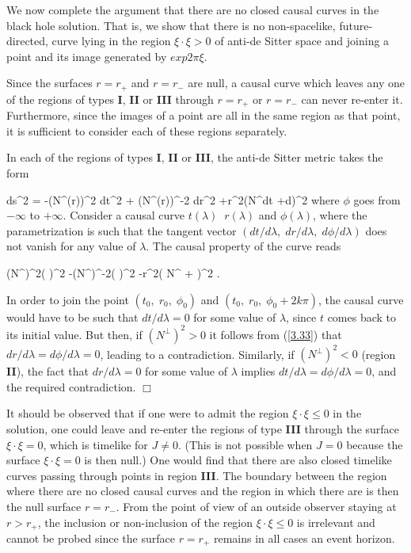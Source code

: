 We now complete the argument that there are no closed causal
curves in the black hole solution. That is, we show that there
is no non-spacelike, future-directed, curve lying in the region
$\xi \cdot \xi >0$ of anti-de Sitter space and joining a point
and its image generated by $exp 2\pi \xi$.

Since the surfaces $r=r_{+}$ and $r=r_{-}$ are null, a causal
curve which leaves any one of the regions of types {\bf I},
{\bf II} or {\bf III} through $r=r_{+}$ or $r=r_{-}$ can never
re-enter it. Furthermore, since the images of a point are all in
the same region as that point, it is sufficient to consider each
of these regions separately.

In each of the regions of types {\bf I}, {\bf II} or {\bf III},
the anti-de Sitter metric takes the form

\bb
ds^2 = -(N^{\perp}(r))^2 dt^2 + (N^{\perp}(r))^{-2} dr^2
+r^2(N^{\phi}dt +d\phi)^2
\ee
%
where $\phi$ goes from $-\infty$ to $+\infty$. Consider a
causal curve $t(\lambda)\;\; r(\lambda)$ and $\phi(\lambda)$,
where the parametrization is such that the tangent vector
$(dt/d\lambda,\; dr/d\lambda,\; d\phi/d\lambda)$ does not vanish
for any value of $\lambda$. The causal property of the curve
reads

\bb
(N^{\perp})^2\left( \right)^2 -(N^{\perp})^{-2}\left(
 \right)^2
-r^2\left( N^{\phi} + \right)^2
.
\label{3.33}
\ee

In order to join the point $(t_0,\; r_0,\; \phi_0)$ and $(t_0,\;
r_0,\; \phi_0 +2k\pi)$, the causal curve would have to be such
that $dt/d\lambda =0$ for some value of $\lambda$, since
$t$ comes back to its initial value. But then, if $(N^{\perp})^2 > 0$ it
follows from (\ref{3.33}) that $dr/d\lambda = d\phi/d\lambda
=0$, leading to a contradiction.  Similarly, if $(N^{\perp})^2 <0$ (region
{\bf II}), the fact that $dr/d\lambda =0$ for some value
of $\lambda$ implies $dt/d\lambda= d\phi/d\lambda =0$, and the
required contradiction.  $\Box$

It should be observed that if one were to admit the region $\xi
\cdot \xi \leq 0$ in the solution, one could leave and re-enter
the regions of type {\bf III} through the surface $\xi \cdot \xi
=0$, which is timelike for $J \neq 0$. (This is not possible
when $J=0$ because the surface $\xi \cdot \xi =0$ is then null.)
One would find that there are also closed timelike curves
passing through points in region {\bf III}. The boundary between
the region where there are no closed causal curves and the
region in which there are is then the null surface $r=r_{-}$. From the point
of view of an outside observer staying at $r>r_{+}$, the inclusion or
 non-inclusion of the region  $\xi
\cdot \xi \leq 0$  is irrelevant and cannot be probed since the surface $r =
 r_{+}$ remains in all cases an event horizon.


